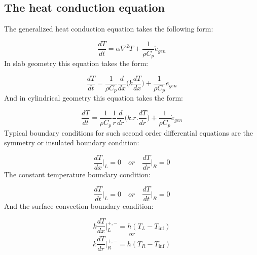 \documentclass[11pt,letterpaper,titlepage]{article}
\begin{document}
\subsection{The heat conduction equation}
The generalized heat conduction equation takes the following form:

\begin{equation}
\frac{dT}{dt}=\alpha \nabla^2 T + \frac{1}{\rho  C_p}\dot{e}_{gen}
\end{equation}
\newline
In slab geometry this equation takes the form:

\begin{equation}
\frac{dT}{dt}=\frac{1}{\rho  C_p} \frac{d}{dx} \biggr( k \frac{dT}{dx} \biggr) + \frac{1}{\rho  C_p}\dot{e}_{gen}
\end{equation}
\newline
And in cylindrical geometry this equation takes the form:

\begin{equation}
\frac{dT}{dt}=\frac{1}{\rho  C_p}\frac{1}{r} \frac{d}{dr} \biggr( k.r.\frac{dT}{dr} \biggr) + \frac{1}{\rho  C_p}\dot{e}_{gen}
\end{equation}
\newline
Typical boundary conditions for such second order differential equations are the symmetry or insulated boundary condition:

\begin{equation*}
\frac{dT}{dx}\biggr|_{L}=0 \quad or \quad \frac{dT}{dr}\biggr|_{R}=0
\end{equation*}
\newline
The constant temperature boundary condition:

\begin{equation*}
\frac{dT}{dt}\biggr|_{L}=0 \quad or \quad \frac{dT}{dt}\biggr|_{R}=0
\end{equation*}
\newline
And the surface convection boundary condition:

\begin{equation*}
k\frac{dT}{dx}\biggr|_L^{+,-}=h(T_L - T_{\inf})
\end{equation*}
\begin{equation*}
or
\end{equation*}
\begin{equation*}
k\frac{dT}{dr}\biggr|_R^{+,-}=h(T_R - T_{\inf})
\end{equation*}
\newline
\end{document}
